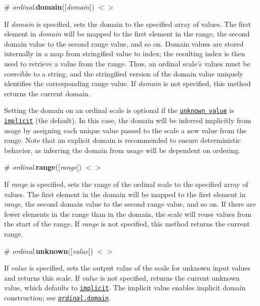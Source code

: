 \label{_ordinal_domain}%
\# {\itshape ordinal}.{\bfseries domain}(\mbox{[}{\itshape domain}\mbox{]}) \href{https://github.com/d3/d3-scale/blob/master/src/ordinal.js#L22}{\tt $<$$>$}

If {\itshape domain} is specified, sets the domain to the specified array of values. The first element in {\itshape domain} will be mapped to the first element in the range, the second domain value to the second range value, and so on. Domain values are stored internally in a map from stringified value to index; the resulting index is then used to retrieve a value from the range. Thus, an ordinal scale’s values must be coercible to a string, and the stringified version of the domain value uniquely identifies the corresponding range value. If {\itshape domain} is not specified, this method returns the current domain.

Setting the domain on an ordinal scale is optional if the \href{#ordinal_unknown}{\tt unknown value} is \href{#scaleImplicit}{\tt implicit} (the default). In this case, the domain will be inferred implicitly from usage by assigning each unique value passed to the scale a new value from the range. Note that an explicit domain is recommended to ensure deterministic behavior, as inferring the domain from usage will be dependent on ordering.

\label{_ordinal_range}%
\# {\itshape ordinal}.{\bfseries range}(\mbox{[}{\itshape range}\mbox{]}) \href{https://github.com/d3/d3-scale/blob/master/src/ordinal.js#L30}{\tt $<$$>$}

If {\itshape range} is specified, sets the range of the ordinal scale to the specified array of values. The first element in the domain will be mapped to the first element in {\itshape range}, the second domain value to the second range value, and so on. If there are fewer elements in the range than in the domain, the scale will reuse values from the start of the range. If {\itshape range} is not specified, this method returns the current range.

\label{_ordinal_unknown}%
\# {\itshape ordinal}.{\bfseries unknown}(\mbox{[}{\itshape value}\mbox{]}) \href{https://github.com/d3/d3-scale/blob/master/src/ordinal.js#L34}{\tt $<$$>$}

If {\itshape value} is specified, sets the output value of the scale for unknown input values and returns this scale. If {\itshape value} is not specified, returns the current unknown value, which defaults to \href{#implicit}{\tt implicit}. The implicit value enables implicit domain construction; see \href{#ordinal_domain}{\tt {\itshape ordinal}.domain}.

